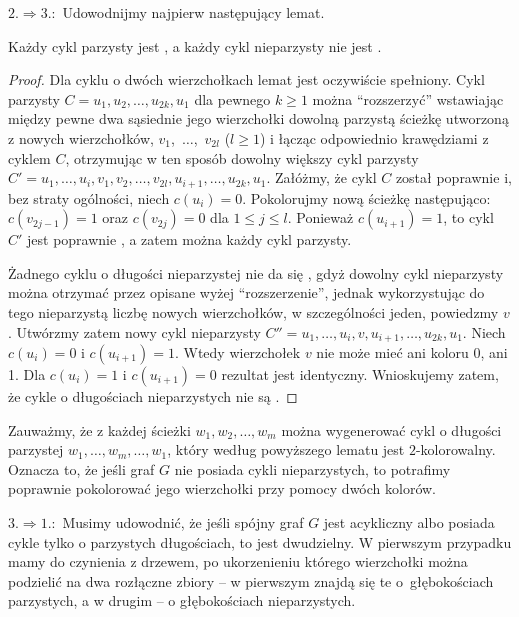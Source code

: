 $2.\Rightarrow 3.\!\!:$ Udowodnijmy najpierw następujący lemat.
\begin{lemat*}
	Każdy cykl parzysty jest , a każdy cykl nieparzysty nie jest .
\end{lemat*}
\begin{proof}
Dla cyklu o dwóch wierzchołkach lemat jest oczywiście spełniony. Cykl parzysty $C = u_1,u_2,\dots,u_{2k},u_1$ dla pewnego $k\ge1$ można ``rozszerzyć'' wstawiając między pewne dwa sąsiednie jego wierzchołki dowolną parzystą ścieżkę utworzoną z nowych wierzchołków, $v_1$,~$\dots$,~$v_{2l}$ ($l\ge1$) i łącząc odpowiednio krawędziami z cyklem $C$, otrzymując w ten sposób dowolny większy cykl parzysty $C' = u_1,\dots,u_i,v_1,v_2,\dots,v_{2l},u_{i+1},\dots,u_{2k},u_1$. Załóżmy, że cykl $C$ został poprawnie  i, bez straty ogólności, niech $c(u_i)=0$. Pokolorujmy nową ścieżkę następująco: $c(v_{2j-1})=1$ oraz $c(v_{2j})=0$ dla $1\le j\le l$. Ponieważ $c(u_{i+1})=1$, to cykl $C'$ jest poprawnie , a zatem można  każdy cykl parzysty.

Żadnego cyklu o długości nieparzystej nie da się , gdyż dowolny cykl nieparzysty można otrzymać przez opisane wyżej ``rozszerzenie'', jednak wykorzystując do tego nieparzystą liczbę nowych wierzchołków, w szczególności jeden, powiedzmy $v$. Utwórzmy zatem nowy cykl nieparzysty $C'' = u_1,\dots,u_i,v,u_{i+1},\dots,u_{2k},u_1$. Niech $c(u_i)=0$ i $c(u_{i+1})=1$. Wtedy wierzchołek $v$ nie może mieć ani koloru 0, ani 1. Dla $c(u_i)=1$ i $c(u_{i+1})=0$ rezultat jest identyczny. Wnioskujemy zatem, że cykle o długościach nieparzystych nie są .
\end{proof}

Zauważmy, że z każdej ścieżki $w_1,w_2,\dots,w_m$ można wygenerować cykl o długości parzystej $w_1,\dots,w_m,\dots,w_1$, który według powyższego lematu jest $2$-kolorowalny. Oznacza to, że jeśli graf $G$ nie posiada cykli nieparzystych, to potrafimy poprawnie pokolorować jego wierzchołki przy pomocy dwóch kolorów.
\bigskip

$3.\Rightarrow 1.\!\!:$ Musimy udowodnić, że jeśli spójny graf $G$ jest acykliczny albo posiada cykle tylko o parzystych długościach, to jest dwudzielny. W pierwszym przypadku mamy do czynienia z drzewem, po ukorzenieniu którego wierzchołki można podzielić na dwa rozłączne zbiory -- w pierwszym znajdą się te o~głębokościach parzystych, a w drugim -- o głębokościach nieparzystych.

